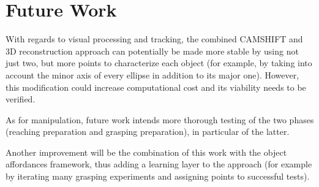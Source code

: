 
\section{Future Work}

With regards to visual processing and tracking, the combined \ac{CAMSHIFT} and 3D reconstruction approach can potentially be made more stable by using not just two, but more points to characterize each object (for example, by taking into account the minor axis of every ellipse in addition to its major one). However, this modification could increase computational cost and its viability needs to be verified.

As for manipulation, future work intends more thorough testing of the two phases (reaching preparation and grasping preparation), in particular of the latter.

Another improvement will be the combination of this work with the object affordances framework, thus adding a learning layer to the approach (for example by iterating many grasping experiments and assigning points to successful tests).